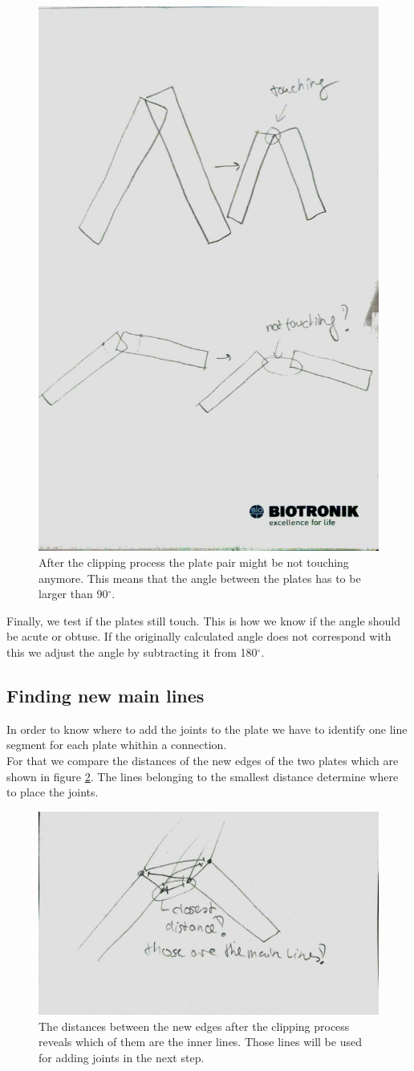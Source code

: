 \documentclass[../ClassicThesis.tex]{subfiles}
\begin{document}
\begin{figure}[!ht]
\centering
\includegraphics[width=.5\columnwidth]{Images/06-1-graph-TouchingOrNotAfterClipping.jpg}
\caption{After the clipping process the plate pair might be not touching anymore. This means that the angle between the plates has to be larger than 90$^\circ$.}
\label{fig:touchingOrNot}
\end{figure}

Finally, we test if the plates still touch. This is how we know if the angle should be acute or obtuse. If the originally calculated angle does not correspond with this we adjust the angle by subtracting it from 180$^\circ$.

\subsection{Finding new main lines}\label{mainLine}
In order to know where to add the joints to the plate we have to identify one line segment for each plate whithin a connection.\\
For that we compare the distances of the new edges of the two plates which are shown in figure \ref{fig:mainLinesAfterClipping}. The lines belonging to the smallest distance determine where to place the joints.
\begin{figure}[!ht]
\centering
\includegraphics[width=.5\columnwidth, angle=90]{Images/06-1-graph-mainLinesAfterClipping.jpg}
\caption{The distances between the new edges after the clipping process reveals which of them are the inner lines. Those lines will be used for adding joints in the next step.}
\label{fig:mainLinesAfterClipping}
\end{figure}
\end{document}
